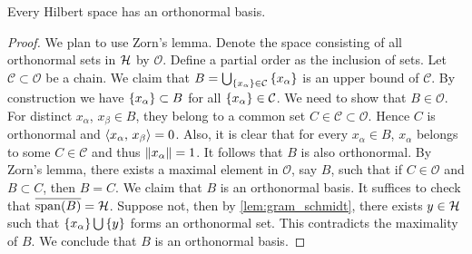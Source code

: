 \begin{theorem}\label{thm:orthonormal_basis_exist}
    Every Hilbert space has an orthonormal basis.
\end{theorem}
\begin{proof}
    We plan to use Zorn's lemma. Denote the space consisting of all orthonormal 
    sets in $\mathcal{H}$ by $\mathcal{O}$. Define a partial order as the inclusion of 
    sets. Let $\mathcal{C}\subset\mathcal{O}$ be a chain. We claim that 
    $B = \bigcup_{\left\{ {x_\alpha} \right\}\in\mathcal{C}}\left\{ {x_\alpha} \right\}$ is an upper bound 
    of $\mathcal{C}$. By construction we have $\left\{ {x_\alpha} \right\}\subset B$ for all 
    $\left\{ {x_\alpha} \right\}\in\mathcal{C}$. We need to show that $B\in\mathcal{O}$. For 
    distinct $x_\alpha$, $x_\beta\in B$, they belong to a common set 
    $C\in\mathcal{C}\subset\mathcal{O}$. Hence $C$ is orthonormal and 
    $\left\langle {x_\alpha},\, {x_\beta} \right\rangle = 0$. Also, it is clear that for every $x_\alpha\in B$, 
    $x_\alpha$ belongs to some $C\in\mathcal{C}$ and thus $\left\lVert {x_\alpha} \right\rVert = 1$. 
    It follows that $B$ is also orthonormal. By Zorn's lemma, there exists a 
    maximal element in $\mathcal{O}$, say $B$, such that if $C\in\mathcal{O}$ 
    and $B\subset C$, then $B = C$. We claim that $B$ is an orthonormal basis. 
    It suffices to check that $\overline{\operatorname{span}(B)} = \mathcal{H}$. Suppose not, then 
    by \cref{lem:gram_schmidt}, there exists $y\in\mathcal{H}$ such that $\left\{ {x_\alpha} \right\}\bigcup\left\{ {y} \right\}$ 
    forms an orthonormal set. This contradicts the maximality of $B$. We 
    conclude that $B$ is an orthonormal basis.
\end{proof}

